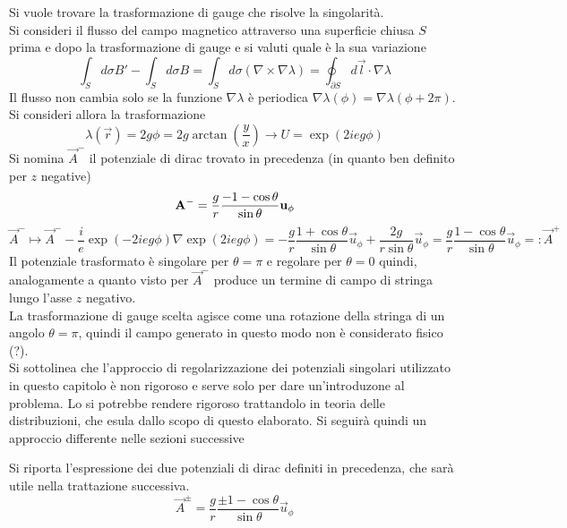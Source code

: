 Si vuole trovare la trasformazione di gauge che risolve la singolarità.\\

Si consideri il flusso del campo magnetico attraverso una superficie chiusa $S$
prima e dopo la trasformazione di gauge e si valuti quale è la sua variazione
$$
   \int_S d\sigma B' - \int_S d\sigma B = \int_S d\sigma (\nabla \times \nabla \lambda)
      = \oint_{\partial S} d\vec l \cdot \nabla \lambda
$$
Il flusso non cambia solo se la funzione $\nabla \lambda$ è periodica $\nabla
\lambda(\phi) = \nabla \lambda( \phi + 2\pi)$. Si consideri allora la trasformazione
$$
\lambda(\vec r) = 2g\phi = 2g\arctan\left(\frac{y}{x}\right) \to U = \exp(2ieg\phi)
$$
Si nomina $\vec A^-$ il potenziale di dirac trovato in precedenza (in quanto ben
definito per $z$ negative)
$$
   \vec A^- = \frac{g}{r}\frac{-1 - \cos\theta}{\sin\theta} \vec u _\phi  \\
$$
$$
  \vec A ^- \mapsto \vec A ^- - \frac{i}{e} \exp( -2ieg\phi )\nabla \exp(2ieg\phi ) =
     -\frac{g}{r}\frac{1+\cos\theta}{\sin\theta}\vec u _\phi
     + \frac{2g}{r\sin\theta}\vec u _\phi
     = \frac{g}{r}\frac{1 - \cos\theta}{\sin\theta} \vec u _\phi
     =: \vec A ^+
$$
Il potenziale trasformato è singolare per $\theta = \pi$ e regolare per
$\theta =  0$ quindi, analogamente a quanto visto per $\vec A^-$ produce un termine
di campo di stringa lungo l'asse $z$ negativo.\\
La trasformazione di gauge scelta agisce come una rotazione della stringa
di un angolo $\theta = \pi$, quindi il campo generato in questo modo non è
considerato fisico (?).\\

Si sottolinea che l'approccio di regolarizzazione dei potenziali singolari
utilizzato in questo capitolo è non rigoroso e serve solo per dare un'introduzone
al problema. Lo si potrebbe rendere rigoroso trattandolo in teoria delle
distribuzioni, che esula dallo scopo di questo elaborato. Si seguirà quindi
un approccio differente nelle sezioni successive

Si riporta l'espressione dei due potenziali di dirac definiti in precedenza, che
sarà utile nella trattazione successiva.
\begin{equation}\label{eq:localdiracpotential}
  \vec A^\pm = \frac{g}{r}\frac{\pm 1 - \cos\theta}{\sin\theta} \vec u _\phi
\end{equation}


